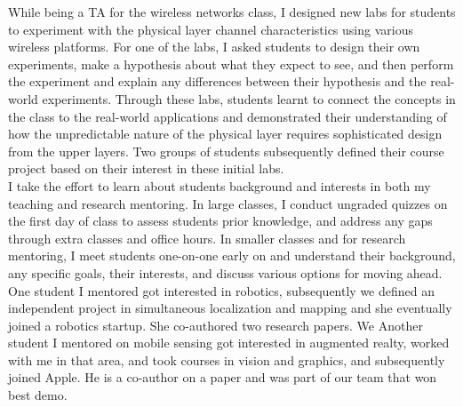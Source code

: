 \documentclass[10pt]{article}
\begin{document}
While being a TA for the wireless networks class, I designed new labs for students to experiment with the physical layer channel characteristics using various wireless platforms. 
For one of the labs, I asked students to design their own experiments, make a hypothesis about what they expect to see, and then perform the experiment and explain any differences between their hypothesis and the real-world experiments. %
Through these labs, students learnt to connect the concepts in the class to the real-world applications and demonstrated their understanding of how the unpredictable nature of the physical layer requires sophisticated design from the upper layers. Two groups of students subsequently defined their course project based on their interest in these initial labs. \\ 

I take the effort to learn about students background and interests in both my teaching and research mentoring. In large classes, I conduct ungraded quizzes on the first day of class to assess students prior knowledge, and address any gaps through extra classes and office hours. In smaller classes and for research mentoring, I meet students one-on-one early on and understand their background, any specific goals, their interests, and discuss various options for moving ahead. %
One student I mentored got interested in robotics, subsequently we defined an independent project in simultaneous localization and mapping and she eventually joined a robotics startup. She co-authored two research papers. We Another student I mentored on mobile sensing got interested in augmented realty, worked with me in that area, and took courses in vision and graphics, and subsequently joined Apple. He is a co-author on a paper and was part of our team that won best demo. \\%
\end{document}
